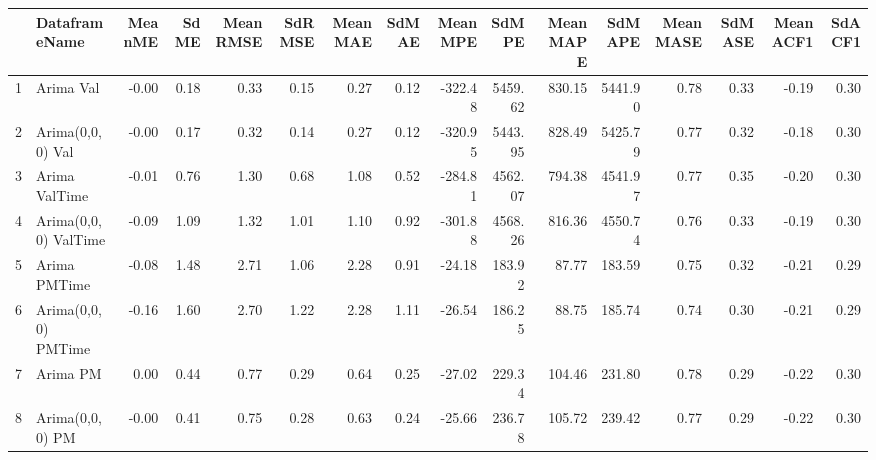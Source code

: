 \begin{table}[ht]
\centering
\begin{tabular}{rlrrrrrrrrrrrrrr}
  \hline
 & DataframeName & MeanME & SdME & MeanRMSE & SdRMSE & MeanMAE & SdMAE & MeanMPE & SdMPE & MeanMAPE & SdMAPE & MeanMASE & SdMASE & MeanACF1 & SdACF1 \\ 
  \hline
1 & Arima Val & -0.00 & 0.18 & 0.33 & 0.15 & 0.27 & 0.12 & -322.48 & 5459.62 & 830.15 & 5441.90 & 0.78 & 0.33 & -0.19 & 0.30 \\ 
  2 & Arima(0,0,0) Val & -0.00 & 0.17 & 0.32 & 0.14 & 0.27 & 0.12 & -320.95 & 5443.95 & 828.49 & 5425.79 & 0.77 & 0.32 & -0.18 & 0.30 \\ 
  3 & Arima ValTime & -0.01 & 0.76 & 1.30 & 0.68 & 1.08 & 0.52 & -284.81 & 4562.07 & 794.38 & 4541.97 & 0.77 & 0.35 & -0.20 & 0.30 \\ 
  4 & Arima(0,0,0) ValTime & -0.09 & 1.09 & 1.32 & 1.01 & 1.10 & 0.92 & -301.88 & 4568.26 & 816.36 & 4550.74 & 0.76 & 0.33 & -0.19 & 0.30 \\ 
  5 & Arima PMTime & -0.08 & 1.48 & 2.71 & 1.06 & 2.28 & 0.91 & -24.18 & 183.92 & 87.77 & 183.59 & 0.75 & 0.32 & -0.21 & 0.29 \\ 
  6 & Arima(0,0,0) PMTime & -0.16 & 1.60 & 2.70 & 1.22 & 2.28 & 1.11 & -26.54 & 186.25 & 88.75 & 185.74 & 0.74 & 0.30 & -0.21 & 0.29 \\ 
  7 & Arima PM & 0.00 & 0.44 & 0.77 & 0.29 & 0.64 & 0.25 & -27.02 & 229.34 & 104.46 & 231.80 & 0.78 & 0.29 & -0.22 & 0.30 \\ 
  8 & Arima(0,0,0) PM & -0.00 & 0.41 & 0.75 & 0.28 & 0.63 & 0.24 & -25.66 & 236.78 & 105.72 & 239.42 & 0.77 & 0.29 & -0.22 & 0.30 \\ 
   \hline
\end{tabular}
\end{table}
